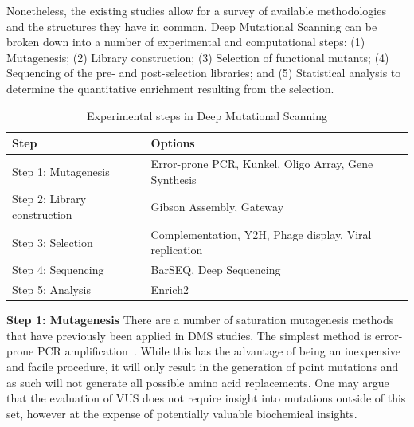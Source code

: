 Nonetheless, the existing studies allow for a survey of available methodologies and the structures they have in common. Deep Mutational Scanning can be broken down into a number of experimental and computational steps: (1) Mutagenesis; (2) Library construction; (3) Selection of functional mutants; (4) Sequencing of the pre- and post-selection libraries; and (5) Statistical analysis to determine the quantitative enrichment resulting from the selection. 

\begin{table}
	\centering
	\caption{Experimental steps in Deep Mutational Scanning}
	\label{table:DMSphases}
	\begin{tabular}{l p{10cm}}
	\textbf{Step}                & \textbf{Options} \\ \hline \hline
	Step 1: Mutagenesis          & Error-prone PCR, Kunkel, Oligo Array, Gene Synthesis\\ 
	Step 2: Library construction & Gibson Assembly, Gateway\\ 
	Step 3: Selection            & Complementation, Y2H, Phage display, Viral replication\\ 
	Step 4: Sequencing           & BarSEQ, Deep Sequencing\\ 
	Step 5: Analysis             & Enrich2\\ 
	\end{tabular}
\end{table}


\textbf{Step 1: Mutagenesis} There are a number of saturation mutagenesis methods that have previously been applied in DMS studies. The simplest method is error-prone PCR amplification~\cite{firstErrorPronePCR,mohan_pcr_2011}. While this has the advantage of being an inexpensive and facile procedure, it will only result in the generation of point mutations and as such will not generate all possible amino acid replacements. One may argue that the evaluation of VUS does not require insight into mutations outside of this set, however at the expense of potentially valuable biochemical insights. 

